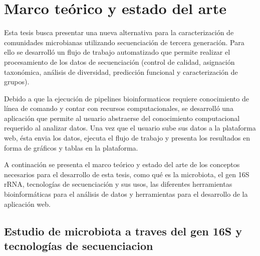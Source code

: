 \chapter{Marco teórico y estado del arte}

Esta tesis busca presentar una nueva alternativa para la caracterización de comunidades microbianas utilizando secuenciación de tercera generación. Para ello se  desarrolló un flujo de trabajo automatizado que permite realizar el procesamiento de los datos de secuenciación (control de calidad, asignación taxonómica, análisis de diversidad, predicción funcional y caracterización de grupos). 

Debido a que la ejecución de pipelines bioinformaticos requiere conocimiento de línea de comando y contar con recursos computacionales, se desarrolló una aplicación que permite al usuario abstraerse del conocimiento computacional requerido al analizar datos. Una vez que el usuario sube sus datos a la plataforma web, ésta envia los datos, ejecuta el flujo de trabajo y presenta los resultados en forma de gráficos y tablas en la plataforma.


A continación se presenta el marco teórico y estado del arte de los conceptos necesarios para el desarrollo de esta tesis, como qué es la microbiota, el gen 16S rRNA, tecnologías de secuenciación y sus usos, las diferentes herramientas bioinformáticas para el análisis de datos y herramientas para el desarrollo de la aplicación web.
\section{Estudio de microbiota a traves del gen 16S y tecnologías de secuenciacion}
